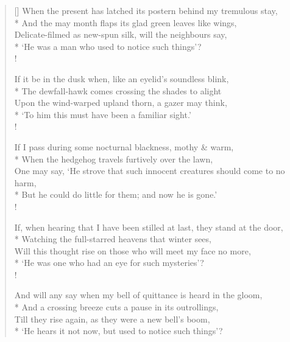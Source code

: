 \documentclass[MAIN]{subfiles}
\begin{document}
\settowidth{\versewidth}{When the present has latched its postern behind my tremulous stay,}
\begin{verse}[\versewidth]
When the present has latched its postern behind my tremulous stay, \\*
\vin And the may month flaps its glad green leaves like wings,\\
Delicate-filmed as new-spun silk, will the neighbours say,\\*
\vin `He was a man who used to notice such things'?\\!

If it be in the dusk when, like an eyelid's soundless blink,\\*
\vin The dewfall-hawk comes crossing the shades to alight\\
Upon the wind-warped upland thorn, a gazer may think,\\*
\vin `To him this must have been a familiar sight.'\\!

If I pass during some nocturnal blackness, mothy \& warm,\\*
\vin When the hedgehog travels furtively over the lawn,\\
One may say, `He strove that such innocent creatures should come to no harm,\\*
\vin But he could do little for them; and now he is gone.'\\!

If, when hearing that I have been stilled at last, they stand at the door,\\*
\vin Watching the full-starred heavens that winter sees,\\
Will this thought rise on those who will meet my face no more,\\*
\vin `He was one who had an eye for such mysteries'?\\!

And will any say when my bell of quittance is heard in the gloom,\\*
\vin And a crossing breeze cuts a pause in its outrollings,\\
Till they rise again, as they were a new bell's boom,\\*
\vin `He hears it not now, but used to notice such things'?
\end{verse}
\end{document}
